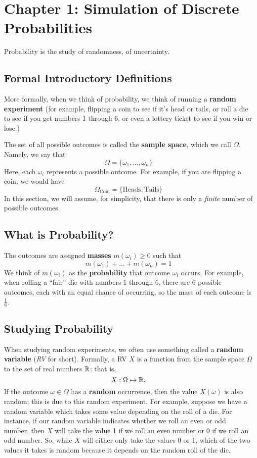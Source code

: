 \documentclass[letterpaper]{article}
\begin{document}
\section{Chapter 1: Simulation of Discrete Probabilities}
Probability is the study of randomness, of uncertainty.

\subsection{Formal Introductory Definitions}
More formally, when we think of probability, we think of running a \textbf{random experiment} (for example, flipping a coin to see if it's head or tails, or roll a die to see if you get numbers 1 through 6, or even a lottery ticket to see if you win or lose.) 

\bigskip 

The set of all possible outcomes is called the \textbf{sample space}, which we call $\Omega$. Namely, we say that 
\[\Omega = \{\omega_1, \dots, \omega_n\}\]
Here, each $\omega_i$ represents a possible outcome. For example, if you are flipping a coin, we would have 
\[\Omega_{\text{Coin}} = \{\text{Heads}, \text{Tails}\}\]
In this section, we will assume, for simplicity, that there is only a \emph{finite} number of possible outcomes. 

\subsection{What is Probability?}
The outcomes are assigned \textbf{masses} $m(\omega_i) \geq 0$ such that 
\[m(\omega_1) + \dots + m(\omega_n) = 1\]
We think of $m(\omega_i)$ as the \textbf{probability} that outcome $\omega_i$ occurs. For example, when rolling a ``fair'' die with numbers 1 through 6, there are 6 possible outcomes, each with an equal chance of occurring, so the mass of each outcome is $\frac{1}{6}$. 

\subsection{Studying Probability}
When studying random experiments, we often use something called a \textbf{random variable} (\emph{RV} for short). Formally, a RV $X$ is a function from the sample space $\Omega$ to the set of real numbers $\mathbb{R}$; that is,
\[X: \Omega \mapsto \mathbb{R}.\]
If the outcome $\omega \in \Omega$ has a \textbf{random} occurrence, then the value $X(\omega)$ is also random; this is due to this random experiment. For example, suppose we have a random variable which takes some value depending on the roll of a die. For instance, if our random variable indicates whether we roll an even or odd number, then $X$ will take the value 1 if we roll an even number or 0 if we roll an odd number. So, while $X$ will either only take the values 0 or 1, which of the two values it takes is random because it depends on the random roll of the die. 
\end{document}
